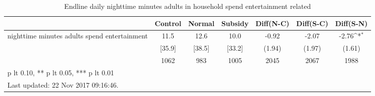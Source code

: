 \begin{table}[htbp]\centering
\def\sym#1{\ifmmode^{#1}\else\(^{#1}\)\fi}
\caption{Endline daily nighttime minutes adults in household spend entertainment related \label{tab:"balance"}}
\begin{tabular*}{1\hsize}{@{\hskip\tabcolsep\extracolsep\fill}l*{1}{cccccc}}
\toprule
                                &  Control&   Normal&  Subsidy&Diff(N-C)         &Diff(S-C)         &Diff(S-N)         \\
\midrule
nighttime minutes adults spend entertainment&     11.5&     12.6&     10.0&    -0.92         &    -2.07         &    -2.76\sym{*}  \\
                                &   [35.9]&   [38.5]&   [33.2]&   (1.94)         &   (1.97)         &   (1.61)         \\
                                &     1062&      983&     1005&     2045         &     2067         &     1988         \\
\bottomrule
\multicolumn{7}{l}{\footnotesize * p lt 0.10, ** p lt 0.05, *** p lt 0.01}\\
\multicolumn{7}{l}{\footnotesize Last updated: 22 Nov 2017 09:16:46.}\\
\end{tabular*}
\end{table}
